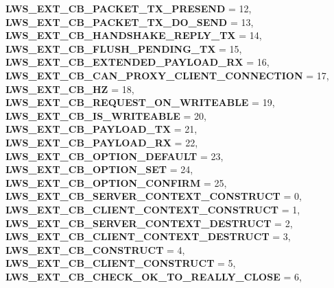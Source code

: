 \begin{DoxyCompactItemize}
{\bfseries L\+W\+S\+\_\+\+E\+X\+T\+\_\+\+C\+B\+\_\+\+P\+A\+C\+K\+E\+T\+\_\+\+T\+X\+\_\+\+P\+R\+E\+S\+E\+ND} = 12, 
{\bfseries L\+W\+S\+\_\+\+E\+X\+T\+\_\+\+C\+B\+\_\+\+P\+A\+C\+K\+E\+T\+\_\+\+T\+X\+\_\+\+D\+O\+\_\+\+S\+E\+ND} = 13, 
\newline
{\bfseries L\+W\+S\+\_\+\+E\+X\+T\+\_\+\+C\+B\+\_\+\+H\+A\+N\+D\+S\+H\+A\+K\+E\+\_\+\+R\+E\+P\+L\+Y\+\_\+\+TX} = 14, 
{\bfseries L\+W\+S\+\_\+\+E\+X\+T\+\_\+\+C\+B\+\_\+\+F\+L\+U\+S\+H\+\_\+\+P\+E\+N\+D\+I\+N\+G\+\_\+\+TX} = 15, 
{\bfseries L\+W\+S\+\_\+\+E\+X\+T\+\_\+\+C\+B\+\_\+\+E\+X\+T\+E\+N\+D\+E\+D\+\_\+\+P\+A\+Y\+L\+O\+A\+D\+\_\+\+RX} = 16, 
{\bfseries L\+W\+S\+\_\+\+E\+X\+T\+\_\+\+C\+B\+\_\+\+C\+A\+N\+\_\+\+P\+R\+O\+X\+Y\+\_\+\+C\+L\+I\+E\+N\+T\+\_\+\+C\+O\+N\+N\+E\+C\+T\+I\+ON} = 17, 
\newline
{\bfseries L\+W\+S\+\_\+\+E\+X\+T\+\_\+\+C\+B\+\_\+HZ} = 18, 
{\bfseries L\+W\+S\+\_\+\+E\+X\+T\+\_\+\+C\+B\+\_\+\+R\+E\+Q\+U\+E\+S\+T\+\_\+\+O\+N\+\_\+\+W\+R\+I\+T\+E\+A\+B\+LE} = 19, 
{\bfseries L\+W\+S\+\_\+\+E\+X\+T\+\_\+\+C\+B\+\_\+\+I\+S\+\_\+\+W\+R\+I\+T\+E\+A\+B\+LE} = 20, 
{\bfseries L\+W\+S\+\_\+\+E\+X\+T\+\_\+\+C\+B\+\_\+\+P\+A\+Y\+L\+O\+A\+D\+\_\+\+TX} = 21, 
\newline
{\bfseries L\+W\+S\+\_\+\+E\+X\+T\+\_\+\+C\+B\+\_\+\+P\+A\+Y\+L\+O\+A\+D\+\_\+\+RX} = 22, 
{\bfseries L\+W\+S\+\_\+\+E\+X\+T\+\_\+\+C\+B\+\_\+\+O\+P\+T\+I\+O\+N\+\_\+\+D\+E\+F\+A\+U\+LT} = 23, 
{\bfseries L\+W\+S\+\_\+\+E\+X\+T\+\_\+\+C\+B\+\_\+\+O\+P\+T\+I\+O\+N\+\_\+\+S\+ET} = 24, 
{\bfseries L\+W\+S\+\_\+\+E\+X\+T\+\_\+\+C\+B\+\_\+\+O\+P\+T\+I\+O\+N\+\_\+\+C\+O\+N\+F\+I\+RM} = 25, 
\newline
{\bfseries L\+W\+S\+\_\+\+E\+X\+T\+\_\+\+C\+B\+\_\+\+S\+E\+R\+V\+E\+R\+\_\+\+C\+O\+N\+T\+E\+X\+T\+\_\+\+C\+O\+N\+S\+T\+R\+U\+CT} = 0, 
{\bfseries L\+W\+S\+\_\+\+E\+X\+T\+\_\+\+C\+B\+\_\+\+C\+L\+I\+E\+N\+T\+\_\+\+C\+O\+N\+T\+E\+X\+T\+\_\+\+C\+O\+N\+S\+T\+R\+U\+CT} = 1, 
{\bfseries L\+W\+S\+\_\+\+E\+X\+T\+\_\+\+C\+B\+\_\+\+S\+E\+R\+V\+E\+R\+\_\+\+C\+O\+N\+T\+E\+X\+T\+\_\+\+D\+E\+S\+T\+R\+U\+CT} = 2, 
{\bfseries L\+W\+S\+\_\+\+E\+X\+T\+\_\+\+C\+B\+\_\+\+C\+L\+I\+E\+N\+T\+\_\+\+C\+O\+N\+T\+E\+X\+T\+\_\+\+D\+E\+S\+T\+R\+U\+CT} = 3, 
\newline
{\bfseries L\+W\+S\+\_\+\+E\+X\+T\+\_\+\+C\+B\+\_\+\+C\+O\+N\+S\+T\+R\+U\+CT} = 4, 
{\bfseries L\+W\+S\+\_\+\+E\+X\+T\+\_\+\+C\+B\+\_\+\+C\+L\+I\+E\+N\+T\+\_\+\+C\+O\+N\+S\+T\+R\+U\+CT} = 5, 
{\bfseries L\+W\+S\+\_\+\+E\+X\+T\+\_\+\+C\+B\+\_\+\+C\+H\+E\+C\+K\+\_\+\+O\+K\+\_\+\+T\+O\+\_\+\+R\+E\+A\+L\+L\+Y\+\_\+\+C\+L\+O\+SE} = 6, 

\end{DoxyCompactItemize}
